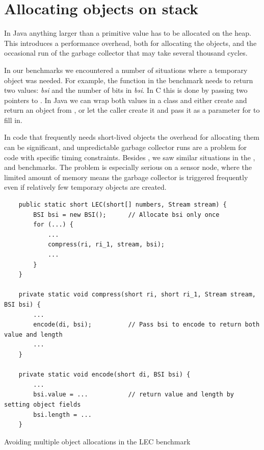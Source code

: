 \section{Allocating objects on stack}
\label{sec-no-gc}
In Java anything larger than a primitive value has to be allocated on the heap. This introduces a performance overhead, both for allocating the objects, and the occasional run of the garbage collector that may take several thousand cycles.

In our benchmarks we encountered a number of situations where a temporary object was needed. For example, the  function in the  benchmark needs to return two values: \emph{bsi} and the number of bits in \emph{bsi}. In C this is done by passing two pointers to . In Java we can wrap both values in a class and either create and return an object from , or let the caller create it and pass it as a parameter for  to fill in.

In code that frequently needs short-lived objects the overhead for allocating them can be significant, and unpredictable garbage collector runs are a problem for code with specific timing constraints. Besides , we saw similar situations in the ,  and  benchmarks. The problem is especially serious on a sensor node, where the limited amount of memory means the garbage collector is triggered frequently even if relatively few temporary objects are created.

\begin{listing}
\begin{verbatim}
    public static short LEC(short[] numbers, Stream stream) {
        BSI bsi = new BSI();      // Allocate bsi only once
        for (...) {
            ...
            compress(ri, ri_1, stream, bsi);
            ...
        }
    }

    private static void compress(short ri, short ri_1, Stream stream, BSI bsi) {
        ...
        encode(di, bsi);          // Pass bsi to encode to return both value and length
        ...
    }

    private static void encode(short di, BSI bsi) {
        ...
        bsi.value = ...           // return value and length by setting object fields
        bsi.length = ...
    }
\end{verbatim}
\caption{Avoiding multiple object allocations in the LEC benchmark}
\label{lst-lec-avoiding-object-allocations}
\end{listing}

